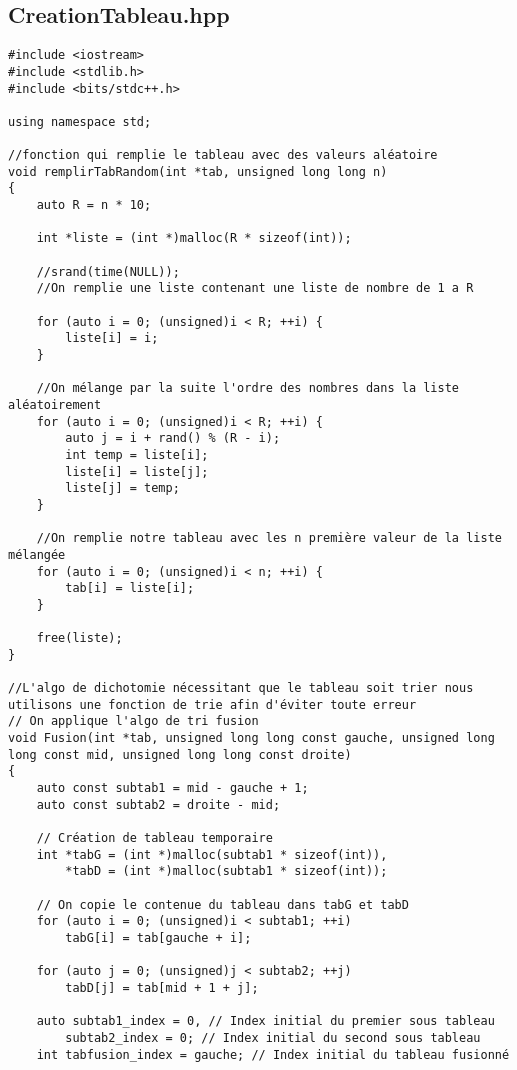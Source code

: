 \subsection{CreationTableau.hpp}
\begin{verbatim}
#include <iostream>
#include <stdlib.h>
#include <bits/stdc++.h>

using namespace std;

//fonction qui remplie le tableau avec des valeurs aléatoire
void remplirTabRandom(int *tab, unsigned long long n)
{
    auto R = n * 10;

    int *liste = (int *)malloc(R * sizeof(int));

    //srand(time(NULL));
    //On remplie une liste contenant une liste de nombre de 1 a R

    for (auto i = 0; (unsigned)i < R; ++i) {
        liste[i] = i;
    }

    //On mélange par la suite l'ordre des nombres dans la liste aléatoirement
    for (auto i = 0; (unsigned)i < R; ++i) {
        auto j = i + rand() % (R - i);
        int temp = liste[i];
        liste[i] = liste[j];
        liste[j] = temp;
    }

    //On remplie notre tableau avec les n première valeur de la liste mélangée
    for (auto i = 0; (unsigned)i < n; ++i) {
        tab[i] = liste[i];
    }

    free(liste);
}

//L'algo de dichotomie nécessitant que le tableau soit trier nous utilisons une fonction de trie afin d'éviter toute erreur
// On applique l'algo de tri fusion
void Fusion(int *tab, unsigned long long const gauche, unsigned long long const mid, unsigned long long const droite)
{
    auto const subtab1 = mid - gauche + 1;
    auto const subtab2 = droite - mid;

    // Création de tableau temporaire
    int *tabG = (int *)malloc(subtab1 * sizeof(int)),
        *tabD = (int *)malloc(subtab1 * sizeof(int));

    // On copie le contenue du tableau dans tabG et tabD
    for (auto i = 0; (unsigned)i < subtab1; ++i)
        tabG[i] = tab[gauche + i];

    for (auto j = 0; (unsigned)j < subtab2; ++j)
        tabD[j] = tab[mid + 1 + j];

    auto subtab1_index = 0, // Index initial du premier sous tableau
        subtab2_index = 0; // Index initial du second sous tableau
    int tabfusion_index = gauche; // Index initial du tableau fusionné


\end{verbatim}
